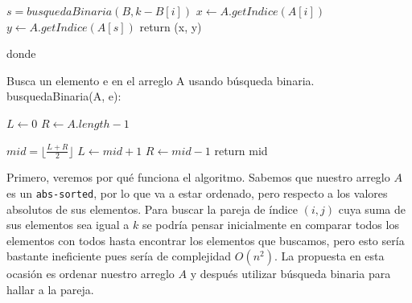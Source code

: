 \documentclass[letterpaper,11pt]{article}
\begin{document}
\begin{enumerate}
\begin{center}
\begin{minipage}[c]{0.75\textwidth}
\begin{algorithm}[H]
\begin{algorithmic}[1]
                    \State $s = busquedaBinaria(B, k-B[i])$
                        \State $x \gets A.getIndice(A[i])$
                        \State $y \gets A.getIndice(A[s])$
                        \State return (x, y)
                    \EndIf
                \EndWhile
                
            \end{algorithmic} 
        \end{algorithm}
        \end{minipage}
    \end{center}

    donde 
    \begin{center}
        \begin{minipage}[c]{0.75\textwidth}
        \begin{algorithm}[H]
            \caption{Busca un elemento e en el arreglo A usando búsqueda binaria. 
                     \\ busquedaBinaria(A, e):} 
            \begin{algorithmic}[1]
                \State $L \gets 0$
                \State $R \gets A.length - 1$
    
                    \State $mid = \lfloor \frac{L + R}{2} \rfloor$
                        \State $L \gets mid + 1$
                    \Else {}
                        \State $R \gets mid -1$
                    \Else 
                        \State return mid 
                    \EndIf
                    \EndIf
                \EndWhile
                
            \end{algorithmic} 
        \end{algorithm}
        \end{minipage}
    \end{center}

    Primero, veremos por qué funciona el algoritmo. Sabemos que nuestro arreglo 
    $A$ es un \texttt{abs-sorted}, por lo que va a estar ordenado, pero
    respecto a los valores absolutos de sus elementos. Para buscar la pareja 
    de índice $(i, j)$ cuya suma de sus elementos sea igual a $k$ se podría 
    pensar inicialmente en comparar todos los elementos con todos hasta 
    encontrar los elementos que buscamos, pero esto sería bastante ineficiente 
    pues sería de complejidad $O(n^2)$. La propuesta en esta ocasión es 
    ordenar nuestro arreglo $A$ y después utilizar búsqueda binaria para hallar 
    a la pareja. 


\end{enumerate}
\end{document}
